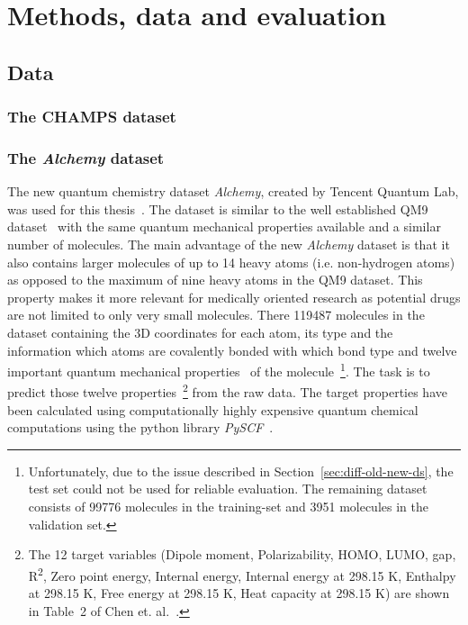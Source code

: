 \chapter{Methods, data and evaluation}
\label{chapter:Methods}


\section{Data}
\label{sec:data-and-features}


\subsection{The CHAMPS dataset}
\label{sec:champs-dataset}


\subsection{The \textit{Alchemy} dataset}
\label{sec:alchemy-dataset}
The new quantum chemistry dataset \textit{Alchemy}, created by Tencent Quantum Lab, was used for this thesis~\cite{Chen2019}. The dataset is similar to the well established QM9 dataset~\cite{Ramakrishnan2014} with the same quantum mechanical properties available and a similar number of molecules. The main advantage of the new \textit{Alchemy} dataset is that it also contains larger molecules of up to 14 heavy atoms (i.e. non-hydrogen atoms) as opposed to the maximum of nine heavy atoms in the QM9 dataset. This property makes it more relevant for medically oriented research as potential drugs are not limited to only very small molecules. 
There 119487 molecules in the dataset containing the 3D coordinates for each atom, its type and the information which atoms are covalently bonded with which bond type and twelve important quantum mechanical properties~\cite{Chen2019} of the molecule~\footnote{
	Unfortunately, due to the issue described in Section~\ref{sec:diff-old-new-ds}, the test set could not be used for reliable evaluation. The remaining dataset consists of 99776 molecules in the training-set and 3951 molecules in the validation set.
}. The task is to predict those twelve properties~\footnote{
	The 12 target variables
	(Dipole moment, Polarizability, HOMO, LUMO, gap, R\textsuperscript2, Zero point energy, Internal energy, Internal energy at 298.15 K, Enthalpy at 298.15 K, Free energy at 298.15 K, Heat capacity at 298.15 K) are shown in Table~2 of Chen et. al.~\cite{Chen2019}.
} from the raw data. The target properties have been calculated using computationally highly expensive quantum chemical computations using the python library \textit{PySCF}~\cite{Sun2017}.



